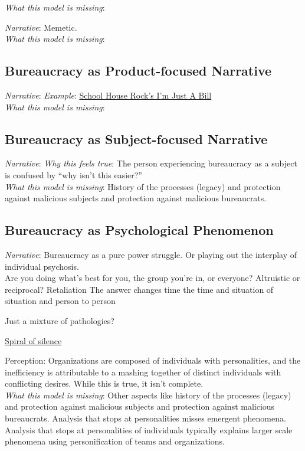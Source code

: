\textit{What this model is missing}: 

\textit{Narrative}: Memetic. \\
\textit{What this model is missing}: 

\subsection{Bureaucracy as Product-focused Narrative}
\textit{Narrative}: 
\textit{Example}: \href{https://www.youtube.com/watch?v=OgVKvqTItto}{School House Rock's I'm Just A Bill}\\
\textit{What this model is missing}: 

\subsection{Bureaucracy as Subject-focused Narrative}
\textit{Narrative}: 
\textit{Why this feels true}: The person experiencing bureaucracy as a subject is confused by ``why isn't this easier?''  \\
\textit{What this model is missing}: History of the processes (legacy) and protection against malicious subjects and protection against malicious bureaucrats. 


\subsection{Bureaucracy as Psychological Phenomenon}

\textit{Narrative}: Bureaucracy as a pure power struggle. Or playing out the interplay of individual psychosis. \\

Are you doing what's best for you, the group you're in, or everyone?
Altruistic or reciprocal? Retaliation
The answer changes time the time and situation of situation and person to person

Just a mixture of pathologies?

\href{https://en.wikipedia.org/wiki/Spiral_of_silence}{Spiral of silence}

Perception: Organizations are composed of individuals with personalities, and the inefficiency is attributable to a mashing together of distinct individuals with conflicting desires.
While this is true, it isn't complete. \\
\textit{What this model is missing}: Other aspects like history of the processes (legacy) and protection against malicious subjects and protection against malicious bureaucrats. Analysis that stops at personalities misses emergent phenomena. Analysis that stops at personalities of individuals typically explains larger scale phenomena using personification of teams and organizations. 



